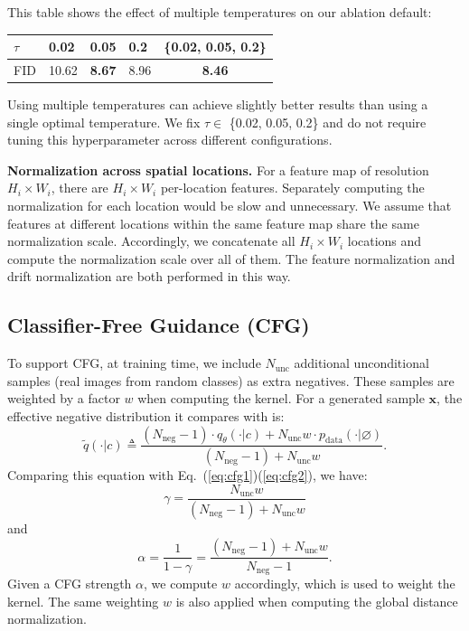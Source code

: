 \documentclass{article}
\newcommand{\tablestyle}[2]{\setlength{\tabcolsep}{#1}\renewcommand{\arraystretch}{#2}\centering
\small
}
\newcommand\tablefontsize{%
  \fontsize{8pt}{9pt}\selectfont
}
\newcommand{\vv}[1]{\mathbf{#1}}
\newcommand{\x}{\vv{x}}
\renewcommand{\paragraph}[1]{\vspace{.05em}\noindent\textbf{#1}}
\theoremstyle{plain}
\theoremstyle{definition}
\theoremstyle{remark}
\begin{document}
This table shows the effect of multiple temperatures on our ablation default:
\begin{center}
    \tablestyle{4pt}{1.05}
    \tablefontsize
    \begin{tabular}{l | x{32} x{32} x{32} | c}
    \toprule
    $\tau$ & 0.02 & 0.05 & 0.2 & \{0.02, 0.05, 0.2\} \\
    \midrule
    FID & 10.62 & \textbf{8.67} & 8.96 & \textbf{8.46} \\
    \bottomrule
    \end{tabular}
\end{center}
Using multiple temperatures can achieve slightly better results than using a single optimal temperature. We fix $\tau \in $ \{0.02, 0.05, 0.2\} and do not require tuning this hyperparameter across different configurations.


\paragraph{Normalization across spatial locations.}
For a feature map of resolution $H_i{\times}W_i$, there are $H_i{\times}W_i$ per-location features.
Separately computing the normalization for each location would be slow and unnecessary.
We assume that features at different locations within the same feature map share the same normalization scale. Accordingly, we concatenate all $H_i{\times}W_i$ locations and compute the normalization scale over all of them.
The feature normalization and drift normalization are both performed in this way.


\subsection{Classifier-Free Guidance (CFG)}
\label{sec:appendix_cfg}

To support CFG, at training time, we include $N_\text{unc}$ additional \mbox{unconditional} samples (real images from random classes) as extra negatives.
These samples are weighted by a factor $w$ when computing the kernel.
For a generated sample $\x$, the effective negative distribution it compares with is:
\[
\tilde{q}(\cdot|c) \triangleq \frac{(N_\text{neg}{-}1) \cdot q_\theta(\cdot|c) + N_\text{unc}  w \cdot p_{\text{data}}(\cdot|\varnothing)}{(N_\text{neg}{-}1) + N_\text{unc} w}.
\]
Comparing this equation with Eq.~(\ref{eq:cfg1})(\ref{eq:cfg2}), we have:
\[
\gamma = \frac{N_\text{unc} w}{(N_\text{neg}{-}1) + N_\text{unc} w}
\]
and
\[
\alpha = \frac{1}{1-\gamma} = \frac{(N_\text{neg}{-}1) + N_\text{unc} w}{N_\text{neg}{-}1}.
\]
Given a CFG strength $\alpha$, we compute $w$ accordingly, which is used to weight the kernel.
The same weighting $w$ is also applied when computing the global distance normalization.
\end{document}
